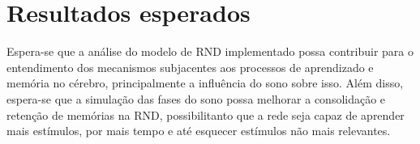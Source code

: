 \chapter{Resultados esperados}

Espera-se que a análise do modelo de RND implementado possa contribuir para o entendimento dos mecanismos subjacentes aos
processos de aprendizado e memória no cérebro, principalmente a influência do sono sobre isso. Além disso, espera-se que a
simulação das fases do sono possa melhorar a consolidação e retenção de memórias na RND, possibilitanto que a rede seja capaz de
aprender mais estímulos, por mais tempo e até esquecer estímulos não mais relevantes.
